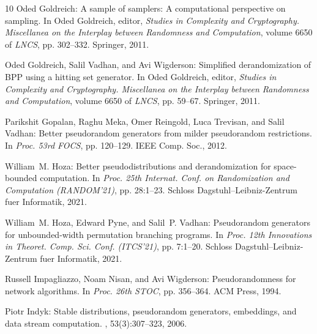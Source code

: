 \documentclass[11pt]{article}
\begin{document}
\begin{thebibliography}{10}
{\sc Oded Goldreich}: A sample of samplers: {A} computational perspective on
  sampling.
\newblock In {\sc Oded Goldreich}, editor, {\em Studies in Complexity and
  Cryptography. Miscellanea on the Interplay between Randomness and
  Computation}, volume 6650 of {\em LNCS}, pp. 302--332. Springer, 2011.

{\sc Oded Goldreich, Salil Vadhan, and Avi Wigderson}: Simplified
  derandomization of {BPP} using a hitting set generator.
\newblock In {\sc Oded Goldreich}, editor, {\em Studies in Complexity and
  Cryptography. Miscellanea on the Interplay between Randomness and
  Computation}, volume 6650 of {\em LNCS}, pp. 59--67. Springer, 2011.
\newblock [\epfmtdoi{10.1007/978-3-642-22670-0\_8}]

{\sc Parikshit Gopalan, Raghu Meka, Omer Reingold, Luca Trevisan, and Salil
  Vadhan}: Better pseudorandom generators from milder pseudorandom
  restrictions.
\newblock In {\em Proc. 53rd FOCS}, pp. 120--129. IEEE Comp. Soc., 2012.

{\sc William~M. Hoza}: Better pseudodistributions and derandomization for
  space-bounded computation.
\newblock In {\em Proc. 25th Internat. Conf. on Randomization and Computation
  (RANDOM'21)}, pp. 28:1--23. Schloss Dagstuhl--Leibniz-Zentrum fuer
  Informatik, 2021.

{\sc William~M. Hoza, Edward Pyne, and Salil~P. Vadhan}: Pseudorandom
  generators for unbounded-width permutation branching programs.
\newblock In {\em Proc. 12th Innovations in Theoret. Comp. Sci. Conf.
  (ITCS'21)}, pp. 7:1--20. Schloss Dagstuhl--Leibniz-Zentrum fuer Informatik,
  2021.

{\sc Russell Impagliazzo, Noam Nisan, and Avi Wigderson}: Pseudorandomness for
  network algorithms.
\newblock In {\em Proc. 26th STOC}, pp. 356--364. ACM Press, 1994.
\newblock [\epfmtdoi{10.1145/195058.195190}]

{\sc Piotr Indyk}: Stable distributions, pseudorandom generators, embeddings,
  and data stream computation.
, 53(3):307--323, 2006.
\newblock [\epfmtdoi{10.1145/1147954.1147955}]


\end{thebibliography}
\end{document}
